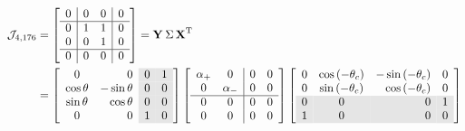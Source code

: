 \begin{equation}
  \begin{split}
    \mathcal{J}_{4,176} &= 
\mat{c|cc|c}
{
                0 & 0 & 0 & 0 \\\hline
                0 & 1 & 1 & 0 \\
                0 & 0 & 1 & 0 \\\hline
                0 & 0 & 0 & 0 \\
}   = \svd{T}\\
   &=
\mat{cr>{\columncolor{ltgray}}c>{\columncolor{ltgray}}c}
{
                 0 & 0 & 0 & 1 \\
                 \cos\theta & -\sin\theta & 0 & 0 \\
                 \sin\theta &  \cos\theta & 0 & 0 \\
                 0 & 0 & 1 & 0
}
\mat{cc|cc}
{                
            \alpha_{+} & 0 & 0 & 0 \\
            0 & \alpha_{-} & 0 & 0 \\\hline
            0 & 0 & 0 & 0\\
            0 & 0 & 0 & 0
}%
\mat{ccrc}
{                
                0 & \cos\paren{-\theta_{c}} & -\sin\paren{-\theta_{c}} & 0 \\
                0 & \sin\paren{-\theta_{c}} &  \cos\paren{-\theta_{c}} & 0 \\
\rowcolor{ltgray}
                0 & 0 & 0 & 1 \\
\rowcolor{ltgray}
                1 & 0 & 0 & 0 \\
}
  \end{split}
\end{equation}
